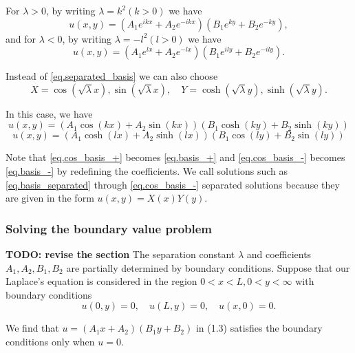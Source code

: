 For $\lambda>0$, by writing $\lambda=k^2(k>0)$ we have
\begin{equation}\label{eq.basis_+}
u(x, y)=\left(A_1 e^{i k x}+A_2 e^{-i k x}\right)\left(B_1 e^{k y}+B_2 e^{-k y}\right),
\end{equation}
and for $\lambda<0$, by writing $\lambda=-l^2(l>0)$ we have
\begin{equation}\label{eq.basis_-}
u(x, y)=\left(A_1 e^{l x}+A_2 e^{-l x}\right)\left(B_1 e^{i l y}+B_2 e^{-i l y}\right) .
\end{equation}

Instead of \eqref{eq.separated_basis} we can also choose
\begin{equation}
X=\cos (\sqrt{\lambda} x), \sin (\sqrt{\lambda} x), \quad Y=\cosh (\sqrt{\lambda} y), \sinh (\sqrt{\lambda} y) .
\end{equation}

In this case, we have
\begin{equation}\label{eq.cos_basis_+}
    u(x, y)=\left(A_1 \cos (k x)+A_2 \sin (k x)\right)\left(B_1 \cosh (k y)+B_2 \sinh (k y)\right)
\end{equation}
\begin{equation}\label{eq.cos_basis_-}
    u(x, y)=\left(A_1 \cosh (l x)+A_2 \sinh (l x)\right)\left(B_1 \cos (l y)+B_2 \sin (l y)\right)
\end{equation}

Note that \eqref{eq.cos_basis_+} becomes \eqref{eq.basis_+} and \eqref{eq.cos_basis_-} becomes \eqref{eq.basis_-} by redefining the coefficients. We call solutions such as \eqref{eq.basis_separated} through \eqref{eq.cos_basis_-} separated solutions because they are given in the form $u(x, y)=X(x) Y(y)$.

\subsubsection{Solving the boundary value problem}
\textbf{TODO: revise the section }
The separation constant $\lambda$ and coefficients $A_1, A_2, B_1, B_2$ are partially determined by boundary conditions. Suppose that our Laplace's equation is considered in the region $0<x<L, 0<y<\infty$ with boundary conditions
\begin{equation*}
u(0, y)=0, \quad u(L, y)=0, \quad u(x, 0)=0.
\end{equation*}

We find that $u=\left(A_1 x+A_2\right)\left(B_1 y+B_2\right)$ in (1.3) satisfies the boundary conditions only when $u=0$.

